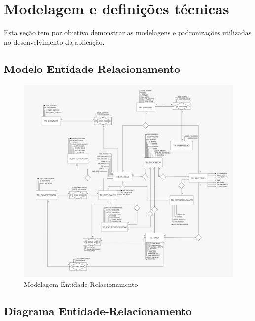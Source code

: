 \section{Modelagem e definições técnicas}
Esta seção tem por objetivo demonstrar as modelagens e padronizações utilizadas no desenvolvimento da aplicação.

\subsection{Modelo Entidade Relacionamento}

\begin{figure}[H]
	\centering 
	\caption{\label{fig:mer}Modelagem Entidade Relacionamento}
	\includegraphics[width=\textwidth]{../imagens/mer-estagiei-3.jpeg} 
\end{figure}

\subsection{Diagrama Entidade-Relacionamento}

